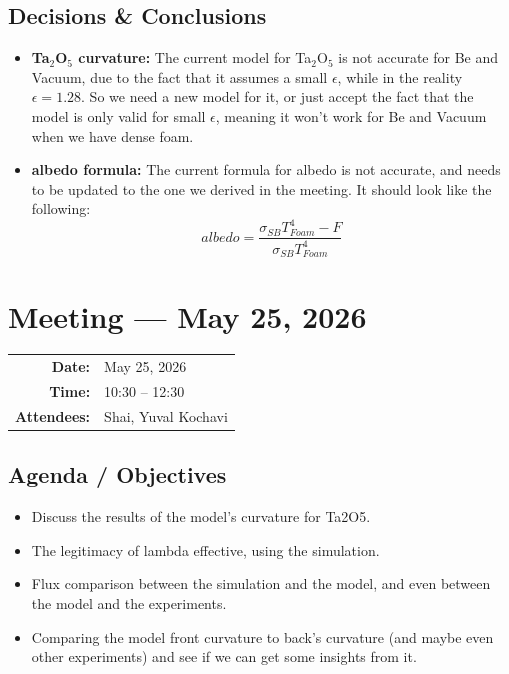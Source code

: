 \documentclass[11pt,a4paper]{article}
\newcommand{\meetingmeta}[3]{
    \noindent
    \colorbox{LightBg}{
        \begin{minipage}{\dimexpr\textwidth-2\fboxsep\relax}
            \vspace{0.5em}
            \hspace{0.5em}
            \begin{tabular}{r l}
                \textbf{Date:} & #1 \\
                \textbf{Time:} & #2 \\
                \textbf{Attendees:} & #3
            \end{tabular}
            \vspace{0.5em}
        \end{minipage}
    }
    \vspace{1em}
}
\begin{document}
\subsection{Decisions \& Conclusions}
\begin{itemize}
    \item \textbf{Ta$_2$O$_5$ curvature:} The current model for Ta$_2$O$_5$ is not accurate for Be and Vacuum, due to the fact that it assumes a small $\epsilon$, while in the reality $\epsilon = 1.28$. So we need a new model for it, or just accept the fact that the model is only valid for small $\epsilon$, meaning it won't work for Be and Vacuum when we have dense foam.
    \item \textbf{albedo formula:} The current formula for albedo is not accurate, and needs to be updated to the one we derived in the meeting. It should look like the following:
    \begin{equation}
        albedo = \frac{\sigma_{SB}T_{Foam}^4 - F}{\sigma_{SB}T_{Foam}^4}
    \end{equation}
\end{itemize}
\newpage
\section{Meeting --- May 25, 2026}
\meetingmeta{May 25, 2026}{10:30 -- 12:30}{Shai, Yuval Kochavi}

\subsection{Agenda / Objectives}
\begin{itemize}
    \item Discuss the results of the model's curvature for Ta2O5.
    \item The legitimacy of lambda effective, using the simulation.
    \item Flux comparison between the simulation and the model, and even between the model and the experiments.
    \item Comparing the model front curvature to back's curvature (and maybe even other experiments) and see if we can get some insights from it.
\end{itemize}
\end{document}
